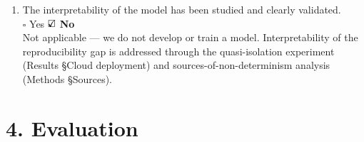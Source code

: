 \documentclass[11pt]{article}
\newcommand{\yes}{\rlap{$\checkmark$}\square}
\newcommand{\no}{\square}
\begin{document}
\begin{enumerate}[label=\Alph*.,leftmargin=2em]
\item The interpretability of the model has been studied and clearly validated.\\
$\no$ Yes \quad $\yes$ \textbf{No}\\
{\small Not applicable --- we do not develop or train a model. Interpretability of the reproducibility gap is addressed through the quasi-isolation experiment (Results \S Cloud deployment) and sources-of-non-determinism analysis (Methods \S Sources).}
\end{enumerate}

\section*{4. Evaluation}
\end{document}
